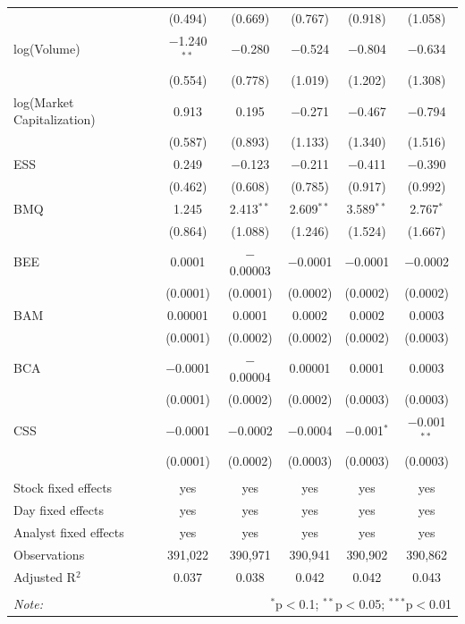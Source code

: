 \begin{tabular}{@{\extracolsep{5pt}}lccccc}
  & (0.494) & (0.669) & (0.767) & (0.918) & (1.058) \\ 
  log(Volume) & $-$1.240$^{**}$ & $-$0.280 & $-$0.524 & $-$0.804 & $-$0.634 \\ 
  & (0.554) & (0.778) & (1.019) & (1.202) & (1.308) \\ 
  log(Market Capitalization) & 0.913 & 0.195 & $-$0.271 & $-$0.467 & $-$0.794 \\ 
  & (0.587) & (0.893) & (1.133) & (1.340) & (1.516) \\ 
  ESS & 0.249 & $-$0.123 & $-$0.211 & $-$0.411 & $-$0.390 \\ 
  & (0.462) & (0.608) & (0.785) & (0.917) & (0.992) \\ 
  BMQ & 1.245 & 2.413$^{**}$ & 2.609$^{**}$ & 3.589$^{**}$ & 2.767$^{*}$ \\ 
  & (0.864) & (1.088) & (1.246) & (1.524) & (1.667) \\ 
  BEE & 0.0001 & $-$0.00003 & $-$0.0001 & $-$0.0001 & $-$0.0002 \\ 
  & (0.0001) & (0.0001) & (0.0002) & (0.0002) & (0.0002) \\ 
  BAM & 0.00001 & 0.0001 & 0.0002 & 0.0002 & 0.0003 \\ 
  & (0.0001) & (0.0002) & (0.0002) & (0.0002) & (0.0003) \\ 
  BCA & $-$0.0001 & $-$0.00004 & 0.00001 & 0.0001 & 0.0003 \\ 
  & (0.0001) & (0.0002) & (0.0002) & (0.0003) & (0.0003) \\ 
  CSS & $-$0.0001 & $-$0.0002 & $-$0.0004 & $-$0.001$^{*}$ & $-$0.001$^{**}$ \\ 
  & (0.0001) & (0.0002) & (0.0003) & (0.0003) & (0.0003) \\ 
 \hline \\[-1.8ex] 
Stock fixed effects & yes & yes & yes & yes & yes \\ 
Day fixed effects & yes & yes & yes & yes & yes \\ 
Analyst fixed effects & yes & yes & yes & yes & yes \\ 
Observations & 391,022 & 390,971 & 390,941 & 390,902 & 390,862 \\ 
Adjusted R$^{2}$ & 0.037 & 0.038 & 0.042 & 0.042 & 0.043 \\ 
\hline 
\hline \\[-1.8ex] 
\textit{Note:}  & \multicolumn{5}{r}{$^{*}$p$<$0.1; $^{**}$p$<$0.05; $^{***}$p$<$0.01} \\ 
\end{tabular} 
